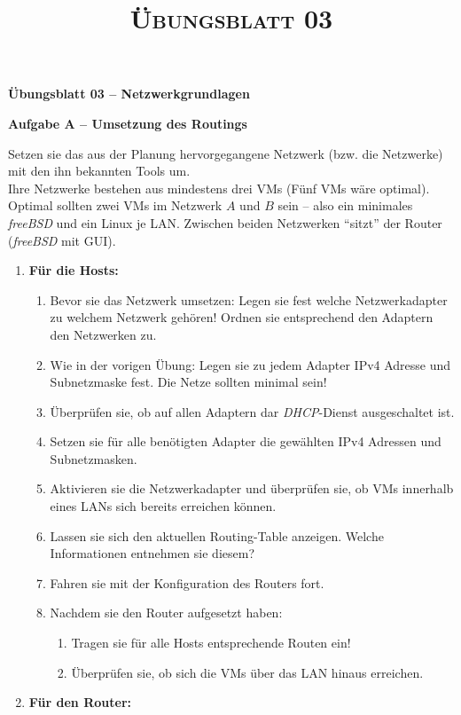 \documentclass[paper=a4,fontsize=11pt]{scrartcl}%
\title{	
\normalfont \normalsize 
\textsc{Übungsblatt 03}
}
\begin{document}
\begin{center}
\Large{\textbf{Übungsblatt 03 -- Netzwerkgrundlagen}}
\end{center}
\begin{center}\Large{\textbf{Aufgabe A -- Umsetzung des Routings}}\end{center}\vskip0.25in
Setzen sie das aus der Planung hervorgegangene Netzwerk (bzw. die Netzwerke) mit den ihn bekannten Tools um.\\
Ihre Netzwerke bestehen aus mindestens drei VMs (Fünf VMs wäre optimal). Optimal sollten zwei VMs im Netzwerk $A$ und $B$ sein -- also ein minimales \emph{freeBSD} und ein Linux je LAN. Zwischen beiden Netzwerken \enquote{sitzt} der Router (\emph{freeBSD} mit GUI).
\begin{enumerate}
	\item \textbf{Für die Hosts:}\\
	\begin{enumerate}
		\item Bevor sie das Netzwerk umsetzen: Legen sie fest welche Netzwerkadapter zu welchem Netzwerk gehören! Ordnen sie entsprechend den Adaptern den Netzwerken zu.
		\item Wie in der vorigen Übung: Legen sie zu jedem Adapter IPv4 Adresse und Subnetzmaske fest. Die Netze sollten minimal sein!
		\item Überprüfen sie, ob auf allen Adaptern dar \emph{DHCP}-Dienst ausgeschaltet ist.
		\item Setzen sie für alle benötigten Adapter die gewählten IPv4 Adressen und Subnetzmasken.
		\item Aktivieren sie die Netzwerkadapter und überprüfen sie, ob VMs innerhalb eines LANs sich bereits erreichen können.
		\item Lassen sie sich den aktuellen Routing-Table anzeigen. Welche Informationen entnehmen sie diesem?
		\item Fahren sie mit der Konfiguration des Routers fort.
		\item Nachdem sie den Router aufgesetzt haben:
		\begin{enumerate}
			\item Tragen sie für alle Hosts entsprechende Routen ein!
			\item Überprüfen sie, ob sich die VMs über das LAN hinaus erreichen.
		\end{enumerate}
	\end{enumerate}
	\item \textbf{Für den Router:}\\

\end{enumerate}
\end{document}
